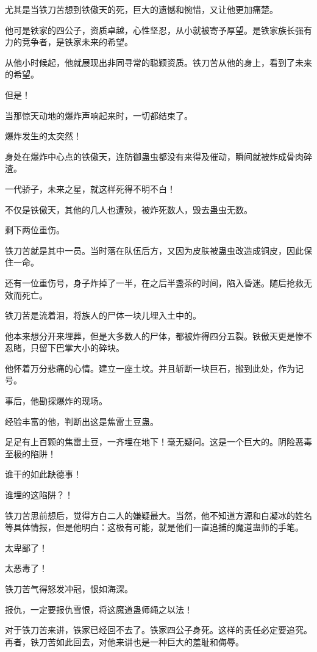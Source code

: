 \begin{this_body}
尤其是当铁刀苦想到铁傲天的死，巨大的遗憾和惋惜，又让他更加痛楚。

他可是铁家的四公子，资质卓越，心性坚忍，从小就被寄予厚望。是铁家族长强有力的竞争者，是铁家未来的希望。

从他小时候起，他就展现出非同寻常的聪颖资质。铁刀苦从他的身上，看到了未来的希望。

但是！

当那惊天动地的爆炸声响起来时，一切都结束了。

爆炸发生的太突然！

身处在爆炸中心点的铁傲天，连防御蛊虫都没有来得及催动，瞬间就被炸成骨肉碎渣。

一代骄子，未来之星，就这样死得不明不白！

不仅是铁傲天，其他的几人也遭殃，被炸死数人，毁去蛊虫无数。

剩下两位重伤。

铁刀苦就是其中一员。当时落在队伍后方，又因为皮肤被蛊虫改造成铜皮，因此保住一命。

还有一位重伤号，身子炸掉了一半，在之后半盏茶的时间，陷入昏迷。随后抢救无效而死亡。

铁刀苦是流着泪，将族人的尸体一块儿埋入土中的。

他本来想分开来埋葬，但是大多数人的尸体，都被炸得四分五裂。铁傲天更是惨不忍睹，只留下巴掌大小的碎块。

他怀着万分悲痛的心情。建立一座土坟。并且斩断一块巨石，搬到此处，作为记号。

事后，他勘探爆炸的现场。

经验丰富的他，判断出这是焦雷土豆蛊。

足足有上百颗的焦雷土豆，一齐埋在地下！毫无疑问。这是一个巨大的。阴险恶毒至极的陷阱！

谁干的如此缺德事！

谁埋的这陷阱？！

铁刀苦思前想后，觉得方白二人的嫌疑最大。当然，他不知道方源和白凝冰的姓名等具体情报，但是他明白：这极有可能，就是他们一直追捕的魔道蛊师的手笔。

太卑鄙了！

太恶毒了！

铁刀苦气得怒发冲冠，恨如海深。

报仇，一定要报仇雪恨，将这魔道蛊师绳之以法！

对于铁刀苦来讲，铁家已经回不去了。铁家四公子身死。这样的责任必定要追究。再者，铁刀苦如此回去，对他来讲也是一种巨大的羞耻和侮辱。


\end{this_body}
